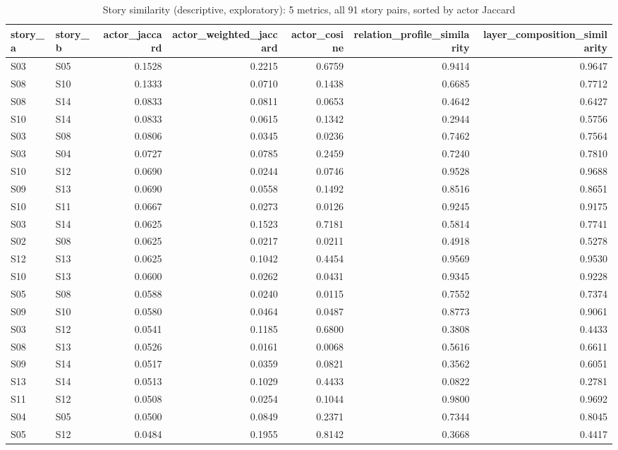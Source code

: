 \begin{table}
\caption{Story similarity (descriptive, exploratory): 5 metrics, all 91 story pairs, sorted by actor Jaccard}
\label{tab:t08_story_similarity}
\begin{tabular}{llrrrrr}
\toprule
story_a & story_b & actor_jaccard & actor_weighted_jaccard & actor_cosine & relation_profile_similarity & layer_composition_similarity \\
\midrule
S03 & S05 & 0.1528 & 0.2215 & 0.6759 & 0.9414 & 0.9647 \\
S08 & S10 & 0.1333 & 0.0710 & 0.1438 & 0.6685 & 0.7712 \\
S08 & S14 & 0.0833 & 0.0811 & 0.0653 & 0.4642 & 0.6427 \\
S10 & S14 & 0.0833 & 0.0615 & 0.1342 & 0.2944 & 0.5756 \\
S03 & S08 & 0.0806 & 0.0345 & 0.0236 & 0.7462 & 0.7564 \\
S03 & S04 & 0.0727 & 0.0785 & 0.2459 & 0.7240 & 0.7810 \\
S10 & S12 & 0.0690 & 0.0244 & 0.0746 & 0.9528 & 0.9688 \\
S09 & S13 & 0.0690 & 0.0558 & 0.1492 & 0.8516 & 0.8651 \\
S10 & S11 & 0.0667 & 0.0273 & 0.0126 & 0.9245 & 0.9175 \\
S03 & S14 & 0.0625 & 0.1523 & 0.7181 & 0.5814 & 0.7741 \\
S02 & S08 & 0.0625 & 0.0217 & 0.0211 & 0.4918 & 0.5278 \\
S12 & S13 & 0.0625 & 0.1042 & 0.4454 & 0.9569 & 0.9530 \\
S10 & S13 & 0.0600 & 0.0262 & 0.0431 & 0.9345 & 0.9228 \\
S05 & S08 & 0.0588 & 0.0240 & 0.0115 & 0.7552 & 0.7374 \\
S09 & S10 & 0.0580 & 0.0464 & 0.0487 & 0.8773 & 0.9061 \\
S03 & S12 & 0.0541 & 0.1185 & 0.6800 & 0.3808 & 0.4433 \\
S08 & S13 & 0.0526 & 0.0161 & 0.0068 & 0.5616 & 0.6611 \\
S09 & S14 & 0.0517 & 0.0359 & 0.0821 & 0.3562 & 0.6051 \\
S13 & S14 & 0.0513 & 0.1029 & 0.4433 & 0.0822 & 0.2781 \\
S11 & S12 & 0.0508 & 0.0254 & 0.1044 & 0.9800 & 0.9692 \\
S04 & S05 & 0.0500 & 0.0849 & 0.2371 & 0.7344 & 0.8045 \\
S05 & S12 & 0.0484 & 0.1955 & 0.8142 & 0.3668 & 0.4417 \\

\end{tabular}
\end{table}
